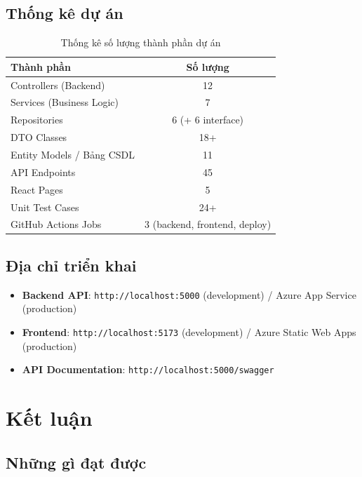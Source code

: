 \documentclass[a4paper]{article}
\begin{document}
\subsection{Thống kê dự án}

\begin{table}[h!]
\centering
\caption{Thống kê số lượng thành phần dự án}
\begin{tabularx}{\textwidth}{|X|c|}
\hline
\textbf{Thành phần} & \textbf{Số lượng} \\
\hline
Controllers (Backend) & 12 \\
\hline
Services (Business Logic) & 7 \\
\hline
Repositories & 6 (+ 6 interface) \\
\hline
DTO Classes & 18+ \\
\hline
Entity Models / Bảng CSDL & 11 \\
\hline
API Endpoints & 45 \\
\hline
React Pages & 5 \\
\hline
Unit Test Cases & 24+ \\
\hline
GitHub Actions Jobs & 3 (backend, frontend, deploy) \\
\hline
\end{tabularx}
\end{table}

\subsection{Địa chỉ triển khai}

\begin{itemize}
    \item \textbf{Backend API}: \texttt{http://localhost:5000} (development) / Azure App Service (production)
    \item \textbf{Frontend}: \texttt{http://localhost:5173} (development) / Azure Static Web Apps (production)
    \item \textbf{API Documentation}: \texttt{http://localhost:5000/swagger}
\end{itemize}

\newpage

\section{Kết luận}

\subsection{Những gì đạt được}
\end{document}

